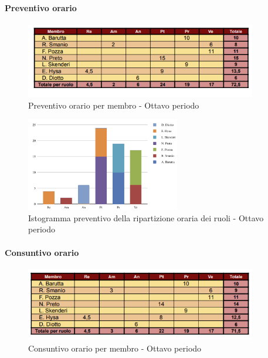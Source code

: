 \paragraph{Preventivo orario}

\begin{figure}[H] 
    \centering
    \includegraphics[width=0.9\textwidth]{../Images/tabPrev8.png}
    \caption{Preventivo orario per membro - Ottavo periodo}
    \label{fig:Preventivo_orario_8}
\end{figure}

\begin{figure}[H]
    \centering
    \includegraphics[width=0.6\textwidth]{../Images/graficoPrev8.png}
    \caption{Istogramma preventivo della ripartizione oraria dei ruoli - Ottavo periodo}
    \label{fig:Preventivo_ripartizione_oraria_8}
\end{figure}

\paragraph{Consuntivo orario}

\begin{figure}[H]
    \centering
    \includegraphics[width=0.9\textwidth]{../Images/tabCons8.png}
    \caption{Consuntivo orario per membro - Ottavo periodo}
    \label{fig:Constuntivo_orario_8}
\end{figure}

